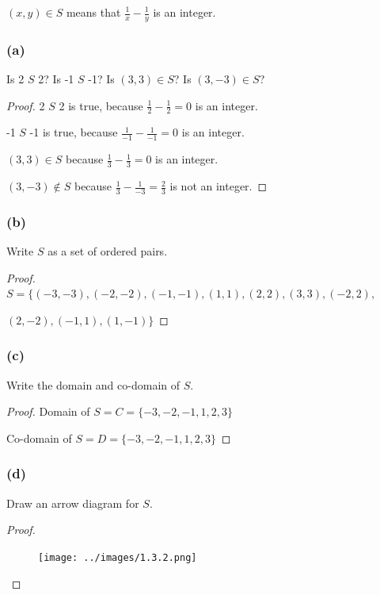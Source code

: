 \documentclass[14pt]{extarticle}
\newcommand{\dps}{\displaystyle}
\begin{document}
\begin{center}
$(x, y) \in S$ means that $\dps \frac{1}{x} - \frac{1}{y}$ is an integer.
\end{center}

\subsubsection{(a)}
Is 2 $S$ 2? Is -1 $S$ -1? Is $(3, 3) \in S$? Is $(3, -3) \in S$?

\begin{proof}
2 $S$ 2 is true, because $\dps \frac{1}{2} - \frac{1}{2} = 0$ is an integer.

-1 $S$ -1 is true, because $\dps \frac{1}{-1} - \frac{1}{-1} = 0$ is an integer.

$(3, 3) \in S$ because $\dps \frac{1}{3} - \frac{1}{3} = 0$ is an integer.

$(3, -3) \notin S$ because $\dps \frac{1}{3} - \frac{1}{-3} = \frac{2}{3}$
is not an integer.
\end{proof}

\subsubsection{(b)}
Write $S$ as a set of ordered pairs.

\begin{proof}
$S = \{(-3, -3), (-2, -2), (-1, -1), (1, 1), (2, 2), (3, 3), (-2, 2),$

$(2, -2), (-1, 1), (1, -1)\}$
\end{proof}

\subsubsection{(c)}
Write the domain and co-domain of $S$.

\begin{proof}
Domain of $S = C = \{-3, -2, -1, 1, 2, 3\}$

Co-domain of $S = D = \{-3, -2, -1, 1, 2, 3\}$
\end{proof}

\subsubsection{(d)}
Draw an arrow diagram for $S$.

\begin{proof}
\begin{figure}[ht!]
\centering
\texttt{[image: ../images/1.3.2.png]}
\end{figure}
\end{proof}
\end{document}
